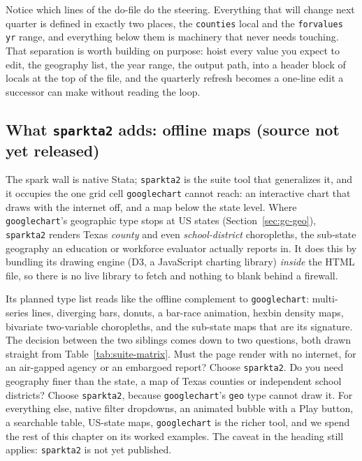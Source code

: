 Notice which lines of the do-file do the steering. Everything that will change next quarter is defined in exactly two places, the \texttt{counties} local and the \texttt{forvalues yr} range, and everything below them is machinery that never needs touching. That separation is worth building on purpose: hoist every value you expect to edit, the geography list, the year range, the output path, into a header block of locals at the top of the file, and the quarterly refresh becomes a one-line edit a successor can make without reading the loop.

\subsection{What \texttt{sparkta2} adds: offline maps (source not yet released)}\label{sec:sparkta2}
The spark wall is native Stata; \texttt{sparkta2} is the suite tool that generalizes it, and it occupies the one grid cell \texttt{googlechart} cannot reach: an interactive chart that draws with the internet off, and a map below the state level. Where \texttt{googlechart}'s geographic type stops at US states (Section~\ref{sec:gc-geo}), \texttt{sparkta2} renders Texas \emph{county} and even \emph{school-district} choropleths, the sub-state geography an education or workforce evaluator actually reports in. It does this by bundling its drawing engine (D3, a JavaScript charting library) \emph{inside} the HTML file, so there is no live library to fetch and nothing to blank behind a firewall.

Its planned type list reads like the offline complement to \texttt{googlechart}: multi-series lines, diverging bars, donuts, a bar-race animation, hexbin density maps, bivariate two-variable choropleths, and the sub-state maps that are its signature. The decision between the two siblings comes down to two questions, both drawn straight from Table~\ref{tab:suite-matrix}. Must the page render with no internet, for an air-gapped agency or an embargoed report? Choose \texttt{sparkta2}. Do you need geography finer than the state, a map of Texas counties or independent school districts? Choose \texttt{sparkta2}, because \texttt{googlechart}'s \texttt{geo} type cannot draw it. For everything else, native filter dropdowns, an animated bubble with a Play button, a searchable table, US-state maps, \texttt{googlechart} is the richer tool, and we spend the rest of this chapter on its worked examples. The caveat in the heading still applies: \texttt{sparkta2} is not yet published.

